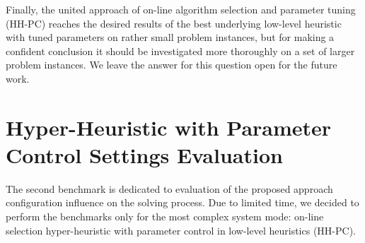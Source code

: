 Finally, the united approach of on-line algorithm selection and parameter tuning (HH-PC) reaches the desired results of the best underlying low-level heuristic with tuned parameters on rather small problem instances, but for making a confident conclusion it should be investigated more thoroughly on a set of larger problem instances. We leave the answer for this question open for the future work.

\section{Hyper-Heuristic with Parameter Control Settings Evaluation}\label{eval:2}
The second benchmark is dedicated to evaluation of the proposed approach configuration influence on the solving process.
Due to limited time, we decided to perform the benchmarks only for the most complex system mode: on-line selection hyper-heuristic with parameter control in low-level heuristics (HH-PC).

